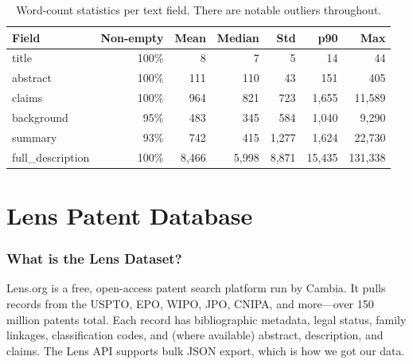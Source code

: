 \documentclass[11pt]{article}
\begin{document}
\begin{table}[H]
  \centering
  \begin{tabular}{lrrrrrr}
    \toprule
    \textbf{Field} & \textbf{Non-empty} & \textbf{Mean} & \textbf{Median} &
    \textbf{Std} & \textbf{p90} & \textbf{Max} \\
    \midrule
    title            & 100\% &  8    &    7  &    5  &     14  &     44 \\
    abstract         & 100\% & 111   &  110  &   43  &    151  &    405 \\
    claims           & 100\% & 964   &  821  &  723  &  1,655  & 11,589 \\
    background       &  95\% & 483   &  345  &  584  &  1,040  &  9,290 \\
    summary          &  93\% & 742   &  415  & 1,277 &  1,624  & 22,730 \\
    full\_description & 100\% & 8,466 & 5,998 & 8,871 & 15,435 & 131,338 \\
    \bottomrule
  \end{tabular}
  \caption{Word-count statistics per text field. There are notable outliers throughout.}
  \label{tab:hupd_text_lengths}
\end{table}

\part{Lens Patent Database}

\section{What is the Lens Dataset?}

Lens.org is a free, open-access patent search platform run by Cambia. It pulls records
from the USPTO, EPO, WIPO, JPO, CNIPA, and more---over 150 million patents total. Each
record has bibliographic metadata, legal status, family linkages, classification codes,
and (where available) abstract, description, and claims. The Lens API supports bulk JSON
export, which is how we got our data.

\end{document}

